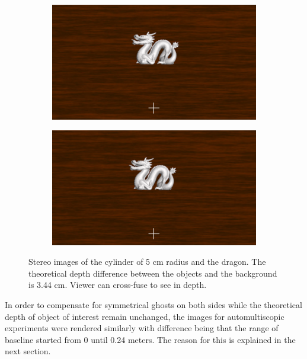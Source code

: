 \begin{figure}[htbp]
    \begin{subfigure}[b]{0.5\textwidth}
        \includegraphics[width=\textwidth]{./Template_Figures/57Ld.png}
        \caption{}\label{fig:left_stereo_dra}
    \end{subfigure}
    \begin{subfigure}[b]{0.5\textwidth}
        \includegraphics[width=\textwidth]{./Template_Figures/57Rd.png}
        \caption{}\label{fig:right_stereo_dra}
    \end{subfigure}
    \caption{Stereo images of the cylinder of 5 cm radius and the dragon. The theoretical depth difference between the objects and the background is 3.44 cm. Viewer can cross-fuse to see in depth.\label{fig:stimuli_stereo}}
\end{figure}

In order to compensate for symmetrical ghosts on both sides while the theoretical depth of object of interest remain unchanged, the images for automultiscopic experiments were rendered similarly with difference being that the range of baseline started from 0 until 0.24 meters. The reason for this is explained in the next section.

